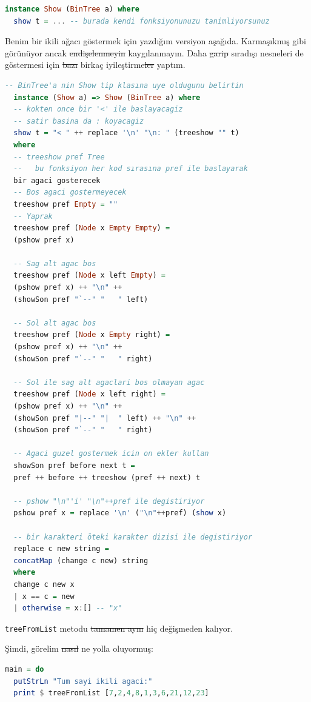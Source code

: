 \documentclass[a4paper,14pt,openany]{extbook} %
\begin{document}
\begin{lstlisting}[language=Haskell]
  instance Show (BinTree a) where
  show t = ... -- burada kendi fonksiyonunuzu tanimliyorsunuz
\end{lstlisting}

Benim bir ikili ağacı göstermek için yazdığım versiyon aşağıda.
Karmaşıkmış gibi görünüyor ancak \st{endişelenmeyin} kaygılanmayın.
Daha \st{garip} sıradışı nesneleri de göstermesi için \st{bazı}
birkaç iyileştirme\st{ler} yaptım.

\begin{lstlisting}[language=Haskell]
  -- BinTree'a nin Show tip klasına uye oldugunu belirtin
  instance (Show a) => Show (BinTree a) where
  -- kokten once bir '<' ile baslayacagiz
  -- satir basina da : koyacagiz
  show t = "< " ++ replace '\n' "\n: " (treeshow "" t)
  where
  -- treeshow pref Tree
  --   bu fonksiyon her kod sırasına pref ile baslayarak
  bir agaci gosterecek
  -- Bos agaci gostermeyecek
  treeshow pref Empty = ""
  -- Yaprak
  treeshow pref (Node x Empty Empty) =
  (pshow pref x)

  -- Sag alt agac bos
  treeshow pref (Node x left Empty) =
  (pshow pref x) ++ "\n" ++
  (showSon pref "`--" "   " left)

  -- Sol alt agac bos
  treeshow pref (Node x Empty right) =
  (pshow pref x) ++ "\n" ++
  (showSon pref "`--" "   " right)

  -- Sol ile sag alt agaclari bos olmayan agac
  treeshow pref (Node x left right) =
  (pshow pref x) ++ "\n" ++
  (showSon pref "|--" "|  " left) ++ "\n" ++
  (showSon pref "`--" "   " right)

  -- Agaci guzel gostermek icin on ekler kullan
  showSon pref before next t =
  pref ++ before ++ treeshow (pref ++ next) t

  -- pshow "\n"'i' "\n"++pref ile degistiriyor
  pshow pref x = replace '\n' ("\n"++pref) (show x)

  -- bir karakteri öteki karakter dizisi ile degistiriyor
  replace c new string =
  concatMap (change c new) string
  where
  change c new x
  | x == c = new
  | otherwise = x:[] -- "x"
\end{lstlisting}

\lstinline!treeFromList! metodu \st{tamamen aynı} hiç değişmeden kalıyor.

Şimdi, görelim \st{nasıl} ne yolla oluyormuş:

\begin{lstlisting}[language=Haskell]
  main = do
  putStrLn "Tum sayi ikili agaci:"
  print $ treeFromList [7,2,4,8,1,3,6,21,12,23]
\end{lstlisting}
\end{document}
